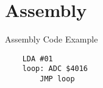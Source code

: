 \chapter{Assembly}

Assembly Code Example

\begin{verbatim}
    LDA #01
    loop: ADC $4016
        JMP loop


\end{verbatim}


